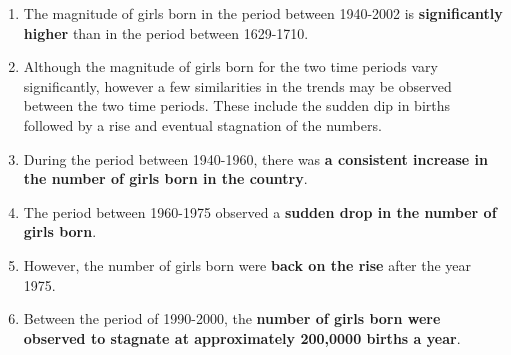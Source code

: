 \documentclass[11pt,a4paper,]{article}
\providecommand{\tightlist}{%
  \setlength{\itemsep}{0pt}\setlength{\parskip}{0pt}}
\begin{document}
\begin{enumerate}
\def\labelenumi{\arabic{enumi}.}
\tightlist
\item
  The magnitude of girls born in the period between 1940-2002 is \textbf{significantly higher} than in the period between 1629-1710.
\item
  Although the magnitude of girls born for the two time periods vary significantly, however a few similarities in the trends may be observed between the two time periods. These include the sudden dip in births followed by a rise and eventual stagnation of the numbers.
\item
  During the period between 1940-1960, there was \textbf{a consistent increase in the number of girls born in the country}.
\item
  The period between 1960-1975 observed a \textbf{sudden drop in the number of girls born}.
\item
  However, the number of girls born were \textbf{back on the rise} after the year 1975.
\item
  Between the period of 1990-2000, the \textbf{number of girls born were observed to stagnate at approximately 200,0000 births a year}.
\end{enumerate}

\tiny
\end{document}
